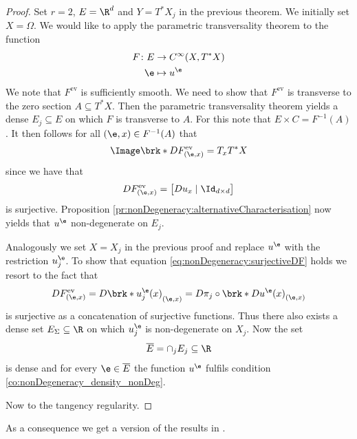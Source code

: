 \begin{proof}
  Set $r=2$, $E=\R^d$ and $Y=T^*X_j$ in the previous theorem.
  We initially set $X=\Omega$.
  We would like to apply the parametric transversality theorem to the function
  \begin{align*}
    F\colon E&\to C^\infty(X,T^*X) \\
    \e&\mapsto u^\e
  \end{align*}
  We note that $F^\text{ev}$ is sufficiently smooth. 
  We need to show that $F^\text{ev}$ is transverse to the
  zero section $A\subseteq T^*X$. Then the parametric transversality theorem 
  yields a dense $E_j\subseteq E$ on which
  $F$ is transverse to $A$.
  For this note that $E\times C = F^{-1}(A)$.
  It then follows for all $(\e,x)\in F^{-1}(A)$ that
  \begin{align}
    \Image\brk*{DF^\text{ev}_{(\e,x)}}=T_xT^*X\label{eq:nonDegeneracy:surjectiveDF}
  \end{align}
  since we have that
  \begin{align*}
    DF^\text{ev}_{(\e,x)}=\begin{bmatrix}
      Du_x\mid \Id_{d\times d}
    \end{bmatrix}
  \end{align*}
  is surjective. 
  Proposition \ref{pr:nonDegeneracy:alternativeCharacterisation}
  now yields that $u^\e$ non-degenerate on $E_j$.
  
  Analogously we set $X=X_j$ in the previous proof and replace
  $u^\e$ with the restriction $u_j^\e$. To show that 
  equation \eqref{eq:nonDegeneracy:surjectiveDF} holds we resort to the fact that
  \begin{align*}
    DF^\text{ev}_{(\e,x)}
    =D\brk*{u_j^\e(x)}_{(\e,x)}
    =D\pi_j\circ \brk*{Du^\e(x)}_{(\e,x)}
  \end{align*}
  is surjective as a concatenation of surjective functions.
  Thus there also exists a dense set $E_\Sigma\subseteq\R$ on which $u^\e_j$ is
  non-degenerate on $X_j$. Now the set
  \begin{align}
    \overline{E}=\cap_j E_j\subseteq\R
  \end{align}
  is dense and
  for every $\e\in\overline{E}$ the function $u^\e$ fulfils condition \ref{co:nonDegeneracy_density_nonDeg}.

  Now to the tangency regularity. 
\end{proof}

As a consequence we get a version of the results in \cite[§2]{Morse1970}.

